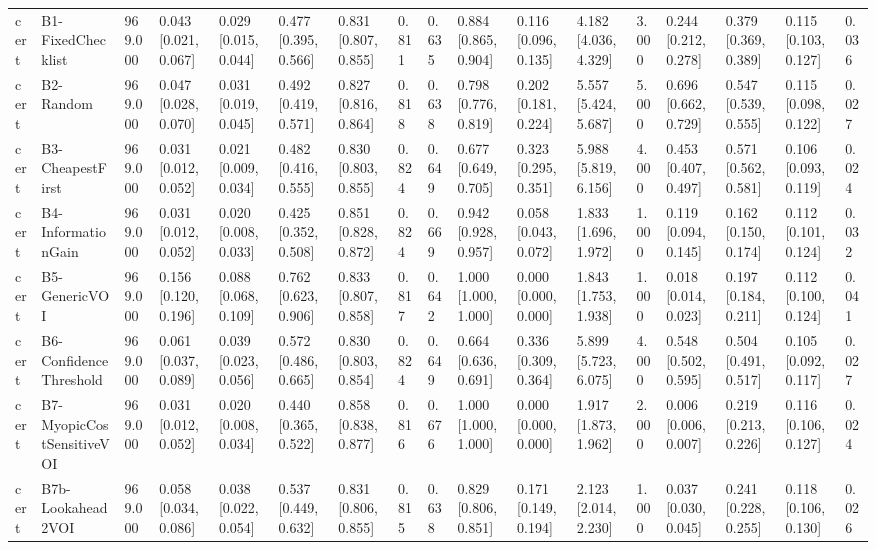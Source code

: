\begin{table}[!ht]
{\begin{tabular}{lllllllllllllllll}
cert & B1-FixedChecklist & 969.000 & 0.043 [0.021, 0.067] & 0.029 [0.015, 0.044] & 0.477 [0.395, 0.566] & 0.831 [0.807, 0.855] & 0.811 & 0.635 & 0.884 [0.865, 0.904] & 0.116 [0.096, 0.135] & 4.182 [4.036, 4.329] & 3.000 & 0.244 [0.212, 0.278] & 0.379 [0.369, 0.389] & 0.115 [0.103, 0.127] & 0.036 \\
cert & B2-Random & 969.000 & 0.047 [0.028, 0.070] & 0.031 [0.019, 0.045] & 0.492 [0.419, 0.571] & 0.827 [0.816, 0.864] & 0.818 & 0.638 & 0.798 [0.776, 0.819] & 0.202 [0.181, 0.224] & 5.557 [5.424, 5.687] & 5.000 & 0.696 [0.662, 0.729] & 0.547 [0.539, 0.555] & 0.115 [0.098, 0.122] & 0.027 \\
cert & B3-CheapestFirst & 969.000 & 0.031 [0.012, 0.052] & 0.021 [0.009, 0.034] & 0.482 [0.416, 0.555] & 0.830 [0.803, 0.855] & 0.824 & 0.649 & 0.677 [0.649, 0.705] & 0.323 [0.295, 0.351] & 5.988 [5.819, 6.156] & 4.000 & 0.453 [0.407, 0.497] & 0.571 [0.562, 0.581] & 0.106 [0.093, 0.119] & 0.024 \\
cert & B4-InformationGain & 969.000 & 0.031 [0.012, 0.052] & 0.020 [0.008, 0.033] & 0.425 [0.352, 0.508] & 0.851 [0.828, 0.872] & 0.824 & 0.669 & 0.942 [0.928, 0.957] & 0.058 [0.043, 0.072] & 1.833 [1.696, 1.972] & 1.000 & 0.119 [0.094, 0.145] & 0.162 [0.150, 0.174] & 0.112 [0.101, 0.124] & 0.032 \\
cert & B5-GenericVOI & 969.000 & 0.156 [0.120, 0.196] & 0.088 [0.068, 0.109] & 0.762 [0.623, 0.906] & 0.833 [0.807, 0.858] & 0.817 & 0.642 & 1.000 [1.000, 1.000] & 0.000 [0.000, 0.000] & 1.843 [1.753, 1.938] & 1.000 & 0.018 [0.014, 0.023] & 0.197 [0.184, 0.211] & 0.112 [0.100, 0.124] & 0.041 \\
cert & B6-ConfidenceThreshold & 969.000 & 0.061 [0.037, 0.089] & 0.039 [0.023, 0.056] & 0.572 [0.486, 0.665] & 0.830 [0.803, 0.854] & 0.824 & 0.649 & 0.664 [0.636, 0.691] & 0.336 [0.309, 0.364] & 5.899 [5.723, 6.075] & 4.000 & 0.548 [0.502, 0.595] & 0.504 [0.491, 0.517] & 0.105 [0.092, 0.117] & 0.027 \\
cert & B7-MyopicCostSensitiveVOI & 969.000 & 0.031 [0.012, 0.052] & 0.020 [0.008, 0.034] & 0.440 [0.365, 0.522] & 0.858 [0.838, 0.877] & 0.816 & 0.676 & 1.000 [1.000, 1.000] & 0.000 [0.000, 0.000] & 1.917 [1.873, 1.962] & 2.000 & 0.006 [0.006, 0.007] & 0.219 [0.213, 0.226] & 0.116 [0.106, 0.127] & 0.024 \\
cert & B7b-Lookahead2VOI & 969.000 & 0.058 [0.034, 0.086] & 0.038 [0.022, 0.054] & 0.537 [0.449, 0.632] & 0.831 [0.806, 0.855] & 0.815 & 0.638 & 0.829 [0.806, 0.851] & 0.171 [0.149, 0.194] & 2.123 [2.014, 2.230] & 1.000 & 0.037 [0.030, 0.045] & 0.241 [0.228, 0.255] & 0.118 [0.106, 0.130] & 0.026 \\

\end{tabular}}
\end{table}
